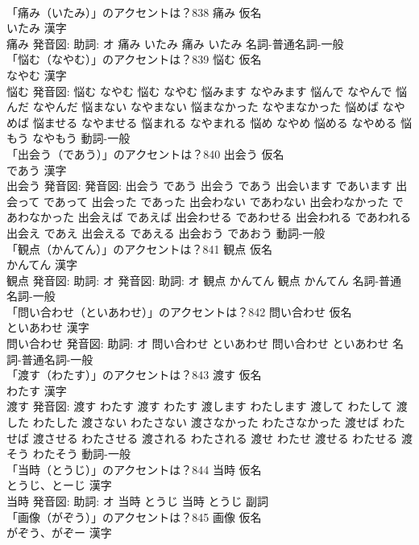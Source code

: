 \documentclass[8pt]{extreport}
\begin{document}
\begin{CJK}{UTF8}{min}
\\	「痛み（いたみ）」のアクセントは？838	痛み 仮名　
\\	いたみ 漢字　
\\	痛み 発音図: 助詞: オ	痛み いたみ		痛み いたみ				名詞-普通名詞-一般 
\\	「悩む（なやむ）」のアクセントは？839	悩む 仮名　
\\	なやむ 漢字　
\\	悩む 発音図:	悩む なやむ		悩む なやむ 悩みます なやみます 悩んで なやんで 悩んだ なやんだ 悩まない なやまない 悩まなかった なやまなかった 悩めば なやめば 悩ませる なやませる 悩まれる なやまれる 悩め なやめ 悩める なやめる 悩もう なやもう				動詞-一般 
\\	「出会う（であう）」のアクセントは？840	出会う 仮名　
\\	であう 漢字　
\\	出会う 発音図: 発音図:	出会う であう		出会う であう 出会います であいます 出会って であって 出会った であった 出会わない であわない 出会わなかった であわなかった 出会えば であえば 出会わせる であわせる 出会われる であわれる 出会え であえ 出会える であえる 出会おう であおう				動詞-一般 
\\	「観点（かんてん）」のアクセントは？841	観点 仮名　
\\	かんてん 漢字　
\\	観点 発音図: 助詞: オ 発音図: 助詞: オ	観点 かんてん		観点 かんてん				名詞-普通名詞-一般 
\\	「問い合わせ（といあわせ）」のアクセントは？842	問い合わせ 仮名　
\\	といあわせ 漢字　
\\	問い合わせ 発音図: 助詞: オ	問い合わせ といあわせ		問い合わせ といあわせ				名詞-普通名詞-一般 
\\	「渡す（わたす）」のアクセントは？843	渡す 仮名　
\\	わたす 漢字　
\\	渡す 発音図:	渡す わたす		渡す わたす 渡します わたします 渡して わたして 渡した わたした 渡さない わたさない 渡さなかった わたさなかった 渡せば わたせば 渡させる わたさせる 渡される わたされる 渡せ わたせ 渡せる わたせる 渡そう わたそう				動詞-一般 
\\	「当時（とうじ）」のアクセントは？844	当時 仮名　
\\	とうじ、とーじ 漢字　
\\	当時 発音図: 助詞: オ	当時 とうじ		当時 とうじ				副詞 
\\	「画像（がぞう）」のアクセントは？845	画像 仮名　
\\	がぞう、がぞー 漢字　

\end{CJK}
\end{document}
